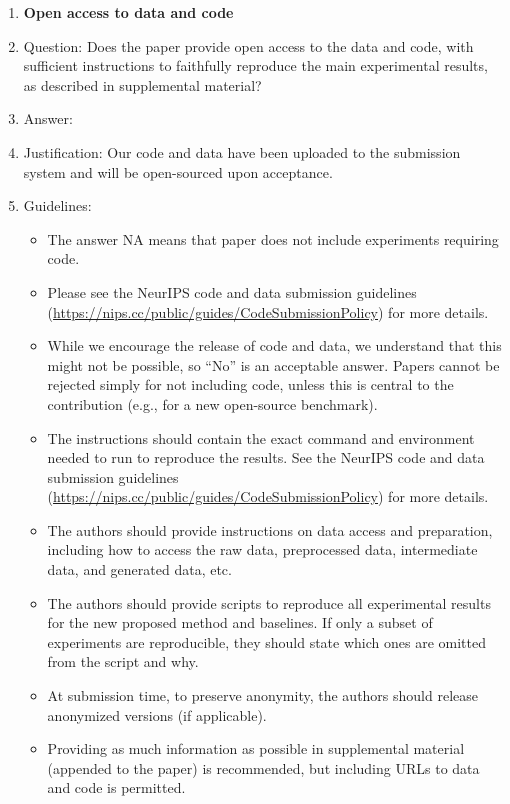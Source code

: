 \documentclass{article}
\begin{document}
\begin{enumerate}
\item {\bf Open access to data and code}
    \item[] Question: Does the paper provide open access to the data and code, with sufficient instructions to faithfully reproduce the main experimental results, as described in supplemental material?
    \item[] Answer: \answerYes{} %
    \item[] Justification: Our code and data have been uploaded to the submission system and will be open-sourced upon acceptance.
    \item[] Guidelines:
    \begin{itemize}
        \item The answer NA means that paper does not include experiments requiring code.
        \item Please see the NeurIPS code and data submission guidelines (\url{https://nips.cc/public/guides/CodeSubmissionPolicy}) for more details.
        \item While we encourage the release of code and data, we understand that this might not be possible, so “No” is an acceptable answer. Papers cannot be rejected simply for not including code, unless this is central to the contribution (e.g., for a new open-source benchmark).
        \item The instructions should contain the exact command and environment needed to run to reproduce the results. See the NeurIPS code and data submission guidelines (\url{https://nips.cc/public/guides/CodeSubmissionPolicy}) for more details.
        \item The authors should provide instructions on data access and preparation, including how to access the raw data, preprocessed data, intermediate data, and generated data, etc.
        \item The authors should provide scripts to reproduce all experimental results for the new proposed method and baselines. If only a subset of experiments are reproducible, they should state which ones are omitted from the script and why.
        \item At submission time, to preserve anonymity, the authors should release anonymized versions (if applicable).
        \item Providing as much information as possible in supplemental material (appended to the paper) is recommended, but including URLs to data and code is permitted.
    \end{itemize}



\end{enumerate}
\end{document}
